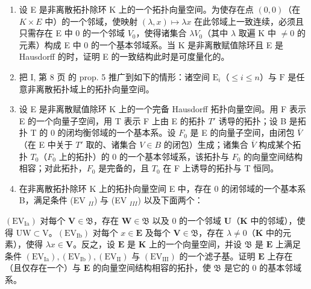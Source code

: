 \begin{enumerate}
\def\labelenumi{\arabic{enumi})}
\setcounter{enumi}{7}
\item
  设 E 是非离散拓扑除环 K 上的一个拓扑向量空间。为使存在点 \((0,0)\)（在 \(K \times E\) 中）的一个邻域，使映射 \((\lambda, x) \mapsto \lambda x\) 在此邻域上一致连续，必须且只需存在 E 中 0 的一个邻域 \(V_{0}\)，使得诸集合 \(\lambda V_{0}\)（其中 \(\lambda\) 取遍 K 中 \(\neq 0\) 的元素）构成 E 中 0 的一个基本邻域系。当 K 是非离散赋值除环且 E 是 Hausdorff 的时，证明 E 的一致结构此时是可度量化的。
\item
  把 I, 第 8 页 的 prop. 5 推广到如下的情形：诸空间 \(\mathrm{E}_i\)（\(\leqslant i \leqslant n\)）与 \(\mathrm{F}\) 是任意非离散拓扑域上的拓扑向量空间。
\item
  设 E 是非离散赋值除环 K 上的一个完备 Hausdorff 拓扑向量空间。用 F 表示 E 的一个向量子空间，用 T 表示 F 上由 E 的拓扑 \(T'\) 诱导的拓扑；设 B 是拓扑 T 的 0 的闭均衡邻域的一个基本系。设 \(F_{0}\) 是 E 的向量子空间，由闭包 \(\overline{V}\)（在 E 中关于 \(T'\) 取的、诸集合 \(V \in B\) 的闭包）生成；诸集合 \(\overline{V}\) 构成某个拓扑 \(T_{0}\)（\(F_{0}\) 上的拓扑）的 0 的一个基本邻域系，该拓扑与 \(F_{0}\) 的向量空间结构相容；对此拓扑，\(F_{0}\) 是完备的，且 \(T_{0}\) 在 F 上诱导的拓扑与 T 恒同。
\item
  在非离散拓扑除环 K 上的拓扑向量空间 E 中，存在 0 的闭邻域的一个基本系 B，满足条件 (EV \(_{II}\)) 与 (EV \(_{III}\)) 以及下面两个：
\end{enumerate}

\((\mathrm{EV}_{\mathrm{Ia}})\) 对每个 \(\mathbf{V} \in \mathfrak{B}\)，存在 \(\mathbf{W} \in \mathfrak{B}\) 以及 0 的一个邻域 \(\mathbf{U}\)（\(\mathbf{K}\) 中的邻域），使得 \(\mathrm{UW} \subset \mathrm{V}\)。\((\mathrm{EV}_{\mathrm{Ib}})\) 对每个 \(x \in \mathbf{E}\) 及每个 \(\mathbf{V} \in \mathfrak{B}\)，存在 \(\lambda \neq 0\)（\(\mathbf{K}\) 中的元素），使得 \(\lambda x \in \mathbf{V}\)。反之，设 \(\mathbf{E}\) 是 \(\mathbf{K}\) 上的一个向量空间，并设 \(\mathfrak{B}\) 是 \(\mathbf{E}\) 上满足条件 \((\mathrm{EV}_{\mathrm{Ia}}), (\mathrm{EV}_{\mathrm{Ib}}), (\mathrm{EV}_{\mathrm{II}})\) 与 \((\mathrm{EV}_{\mathrm{III}})\) 的一个滤子基。证明 \(\mathbf{E}\) 上存在（且仅存在一个）与 \(\mathbf{E}\) 的向量空间结构相容的拓扑，使 \(\mathfrak{B}\) 是它的 0 的基本邻域系。

